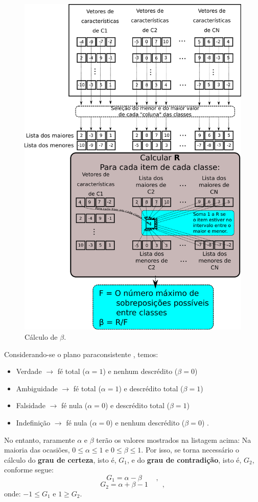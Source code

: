 				\begin{figure}[h]
					\centering
		    	\includegraphics[width=0.77\linewidth]{images/betaCalculation.pdf}
					\caption{Cálculo de $\beta$.}
					\label{fig:betacalculation}
				\end{figure}
				\FloatBarrier
			
				\par Considerando-se o plano paraconsistente \cite{8588433}, temos: 
				
				\begin{itemize}
					\item Verdade $\rightarrow$ fé total ($\alpha = 1$) e nenhum descrédito ($\beta = 0$)
					\item Ambiguidade $\rightarrow$ fé total ($\alpha = 1$) e descrédito total ($\beta = 1$)
					\item Falsidade $\rightarrow$ fé nula ($\alpha = 0$) e descrédito total ($\beta = 1$)
					\item Indefinição $\rightarrow$ fé nula ($\alpha = 0$) e nenhum descrédito ($\beta = 0$) \qquad.
				\end{itemize}
				
				\par No entanto, raramente $\alpha$ e $\beta$ terão os valores mostrados na listagem acima: Na maioria das ocasiões, $0 \leqslant \alpha \leqslant 1$ e $0 \leqslant \beta \leqslant 1$. Por isso, se torna necessário o cálculo do \textbf{grau de certeza}, isto é, $G_1$, e do \textbf{grau de contradição}, isto é, $G_2$, conforme segue:
				\begin{equation}
					G_1=\alpha-\beta  \qquad,
				\end{equation}
				\begin{equation}
					G_2=\alpha+\beta-1 \qquad,
				\end{equation}
			onde: $-1 \leqslant G_1$ e  $1 \geqslant G_2$.

